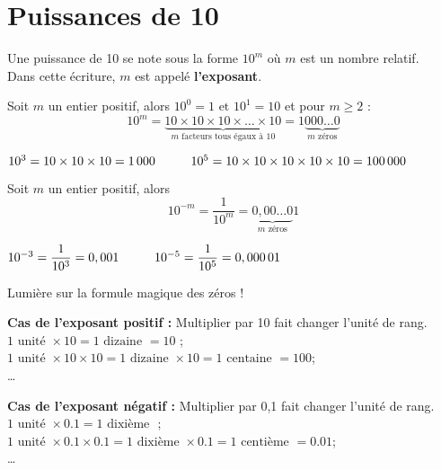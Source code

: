 \section{Puissances de 10}
\begin{definition}
    Une puissance de 10 se note sous la forme $10^m$ o\`{u} $m$ est un nombre relatif.\\
    Dans cette \'ecriture, $m$ est appel\'e \textbf{l'exposant}.
\end{definition}

\begin{definition}
    Soit $m$ un entier positif, alors $10^0=1\mbox{ et }10^1=10$ et pour $m\geq 2$ :
    $$10^m=\underbrace{10\times10\times10\times\ldots\times10}_{\mbox{$m$ facteurs tous égaux à 10}}=1\underbrace{000\ldots0}_{\mbox{$m$ z\'eros}}$$
\end{definition}

\begin{exemple*1}
    $10^3=10\times10\times10=1\,000\kern1cm10^5=10\times10\times10\times10\times10=100\,000$
\end{exemple*1}

\begin{definition}
    Soit $m$ un entier positif, alors
    $$10^{-m}=\frac1{10^m}=\underbrace{0,00\ldots0}_{\mbox{$m$ z\'eros}}1$$
\end{definition}

\begin{exemple*1}
    $10^{-3}=\dfrac1{10^3}=0,001\kern1cm10^{-5}=\dfrac1{10^5}=0,000\,01$
\end{exemple*1}

\begin{center}
\begin{myBox}{ Lumière sur la formule magique des zéros !}
    \begin{list}{}{}
        \item \textbf{Cas de  l'exposant positif :} Multiplier par 10 fait changer l'unité de rang.\\
        $1 \text{ unité } \times 10 = 1 \text{ dizaine } = 10$ ;\\
        $1 \text{ unité } \times 10 \times 10= 1 \text{ dizaine }\times 10 = 1 \text{ centaine } = 100$;\\
        \ldots
        \item \textbf{Cas de  l'exposant négatif :} Multiplier par 0,1 fait changer l'unité de rang.\\
        $1\text{ unité }\times \num{0.1} = 1 \text{ dixième }$ ;\\
        $1\text{ unité }\times \num{0.1} \times \num{0.1} = 1 \text{ dixième }\times \num{0.1} = 1\text{ centième } = \num{0.01}$;\\
        \ldots
    \end{list}

\end{myBox}
\end{center}


